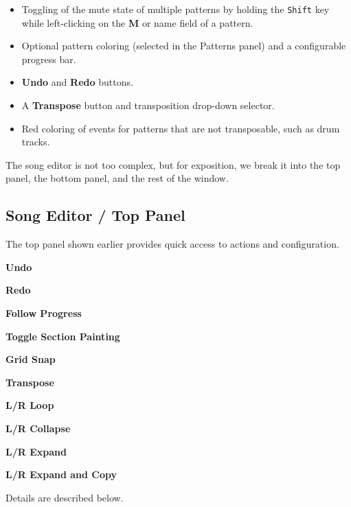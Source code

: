    \begin{itemize}
      \item Toggling of the mute state of multiple patterns by holding the
         \texttt{Shift} key while left-clicking on the \textbf{M}
         or name field of a pattern.
      \item Optional pattern coloring (selected in the Patterns panel)
         and a configurable progress bar.
      \item \textbf{Undo} and \textbf{Redo} buttons.
      \item A \textbf{Transpose} button and transposition drop-down selector.
      \item Red coloring of events for patterns that are not transposable, such
         as drum tracks.
   \end{itemize}

   The song editor is not too complex, but for exposition, we break it into
   the top panel, the bottom panel, and the rest of the window.

\subsection{Song Editor / Top Panel}
\label{subsec:song_editor_top}

   The top panel shown earlier provides quick access to actions
   and configuration.

   \begin{enumber}
      \item \textbf{Undo}
      \item \textbf{Redo}
      \item \textbf{Follow Progress}
      \item \textbf{Toggle Section Painting}
      \item \textbf{Grid Snap}
      \item \textbf{Transpose}
      \item \textbf{L/R Loop}
      \item \textbf{L/R Collapse}
      \item \textbf{L/R Expand}
      \item \textbf{L/R Expand and Copy}
   \end{enumber}

   Details are described below.

   \setcounter{ItemCounter}{0}      %

